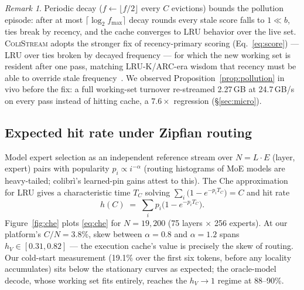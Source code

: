 \documentclass[11pt]{article}
\theoremstyle{definition}
\theoremstyle{remark}
\newtheorem{remark}[theorem]{Remark}
\newcommand{\colistream}{\textsc{ColiStream}}
\begin{document}
\begin{remark}
Periodic decay ($f \leftarrow \lfloor f/2\rfloor$ every $C$ evictions)
bounds the pollution episode: after at most $\lceil \log_2 f_{\max} \rceil$
decay rounds every stale score falls to $1\!\ll\!b$, ties break by recency,
and the cache converges to LRU behavior over the live set. \colistream{}
adopts the stronger fix of recency-primary scoring
(Eq.~\ref{eq:score}) --- LRU over ties broken by decayed frequency --- for
which the new working set is resident after one pass, matching
LRU-K/ARC-era wisdom that recency must be able to override stale
frequency~\citep{oneil1993lruk,megiddo2003arc}. We observed
Proposition~\ref{prop:pollution} in vivo before the fix: a full working-set
turnover re-streamed 2.27\,GB at 24.7\,GB/s on every pass instead of
hitting cache, a $7.6\times$ regression (\S\ref{sec:micro}).
\end{remark}

\subsection{Expected hit rate under Zipfian routing}\label{sec:che}
Model expert selection as an independent reference stream over $N = L\cdot E$
(layer, expert) pairs with popularity $p_i \propto i^{-\alpha}$ (routing
histograms of MoE models are heavy-tailed; colibr\`i's learned-pin gains
attest to this). The Che approximation~\citep{che2002hierarchical} for LRU
gives a characteristic time $T_C$ solving $\sum_i \big(1 -
e^{-p_i T_C}\big) = C$ and hit rate
\begin{equation}
h(C) \;=\; \sum_i p_i\big(1 - e^{-p_i T_C}\big).
\label{eq:che}
\end{equation}
Figure~\ref{fig:che} plots \eqref{eq:che} for $N = 19{,}200$ (75 layers
$\times$ 256 experts). At our platform's $C/N = 3.8\%$, skew between
$\alpha=0.8$ and $\alpha=1.2$ spans $h_V \in [0.31, 0.82]$ --- the execution
cache's value is precisely the skew of routing. Our cold-start measurement
(19.1\% over the first six tokens, before any locality accumulates) sits
below the stationary curves as expected; the oracle-model decode, whose
working set fits entirely, reaches the $h_V\to1$ regime at 88--90\%.
\end{document}
